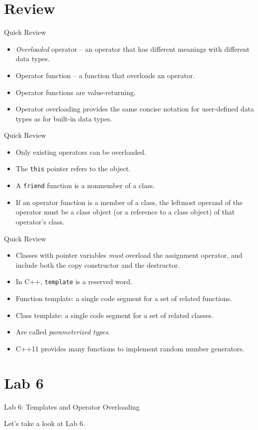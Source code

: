 \documentclass[14pt,aspectratio=1610, hyperref={pdfpagelayout=SinglePage}]{beamer}
\begin{document}
\section{Review}
\begin{frame}[fragile]{Quick Review}
\begin{itemize}[<+->]
\item
  \emph{Overloaded} operator -- an operator that has different meanings with different data types.
\item
  Operator function -- a function that overloads an operator.
\item
  Operator functions are value-returning.
\item
  Operator overloading provides the same concise notation for
  user-defined data types as for built-in data types.
\end{itemize}
\end{frame}

\begin{frame}[fragile]{Quick Review}
\begin{itemize}[<+->]
\item
  Only existing operators can be overloaded.
\item
  The \lstinline{this} pointer refers to the object.
\item
  A \lstinline{friend} function is a nonmember of a class.
\item
  If an operator function is a member of a class,
  the leftmost operand of the operator must be a class object (or a
  reference to a class object) of that operator's class.
\end{itemize}
\end{frame}

\begin{frame}[fragile]{Quick Review}
\begin{itemize}[<+->]
\item
  Classes with pointer variables \emph{must} overload the assignment operator,
  and include both the copy constructor and the destructor.
\item
  In C++, \lstinline{template} is a reserved word.
\item
  Function template: a single code segment for a set of related
  functions.
\item
  Class template: a single code segment for a set of related classes.
\item
  Are called \emph{parameterized types}.
\item
  C++11 provides many functions to implement random number generators.
\end{itemize}
\end{frame}

\section*{Lab 6}
\begin{frame}{Lab 6: Templates and Operator Overloading}
\begin{center}\Large
Let's take a look at Lab 6.
\end{center}
\end{frame}
\end{document}
